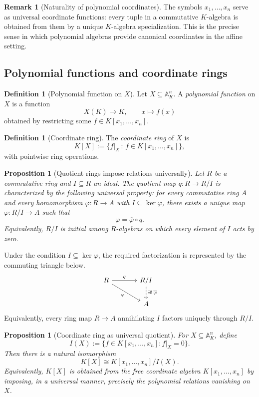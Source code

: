 \documentclass[12pt, a4paper]{article}
\newtheorem{proposition}[theorem]{Proposition}
\theoremstyle{definition}
\newtheorem{definition}[theorem]{Definition}
\newtheorem{remark}[theorem]{Remark}
\newcommand{\A}{\mathbb{A}}
\begin{document}
\begin{remark}[Naturality of polynomial coordinates]
The symbols $x_1,\dots,x_n$ serve as universal coordinate functions: every tuple in a commutative $K$-algebra is obtained from them by a unique $K$-algebra specialization. This is the precise sense in which polynomial algebras provide canonical coordinates in the affine setting.
\end{remark}

\subsection{Polynomial functions and coordinate rings}

\begin{definition}[Polynomial function on $X$]
Let $X\subseteq \A_K^n$. A \emph{polynomial function} on $X$ is a function
\[
X(K)\longrightarrow K,
\qquad
x\longmapsto f(x)
\]
obtained by restricting some $f\in K[x_1,\dots,x_n]$.
\end{definition}

\begin{definition}[Coordinate ring]
The \emph{coordinate ring} of $X$ is
\[
K[X]:=\{f|_X\, :\, f\in K[x_1,\dots,x_n]\},
\]
with pointwise ring operations.
\end{definition}

\begin{proposition}[Quotient rings impose relations universally]
Let $R$ be a commutative ring and $I\subseteq R$ an ideal. The quotient map $q:R\to R/I$ is characterized by the following universal property: for every commutative ring $A$ and every homomorphism $\varphi:R\to A$ with $I\subseteq\ker\varphi$, there exists a unique map $\overline\varphi:R/I\to A$ such that
\[
\varphi=\overline\varphi\circ q.
\]
Equivalently, $R/I$ is initial among $R$-algebras on which every element of $I$ acts by zero.
\end{proposition}

Under the condition $I\subseteq\ker\varphi$, the required factorization is represented by the commuting triangle below.
\[
\begin{tikzcd}[column sep=large]
R \arrow[r, "q"] \arrow[dr, "\varphi"'] & R/I \arrow[d, dashed, "\exists!\,\overline\varphi"] \\
& A
\end{tikzcd}
\]
Equivalently, every ring map $R\to A$ annihilating $I$ factors uniquely through $R/I$.

\begin{proposition}[Coordinate ring as universal quotient]
For $X\subseteq \A_K^n$, define
\[
I(X):=\{f\in K[x_1,\dots,x_n] : f|_X=0\}.
\]
Then there is a natural isomorphism
\[
\boxed{K[X]\cong K[x_1,\dots,x_n]/I(X).}
\]
Equivalently, $K[X]$ is obtained from the free coordinate algebra $K[x_1,\dots,x_n]$ by imposing, in a universal manner, precisely the polynomial relations vanishing on $X$.
\end{proposition}
\end{document}
